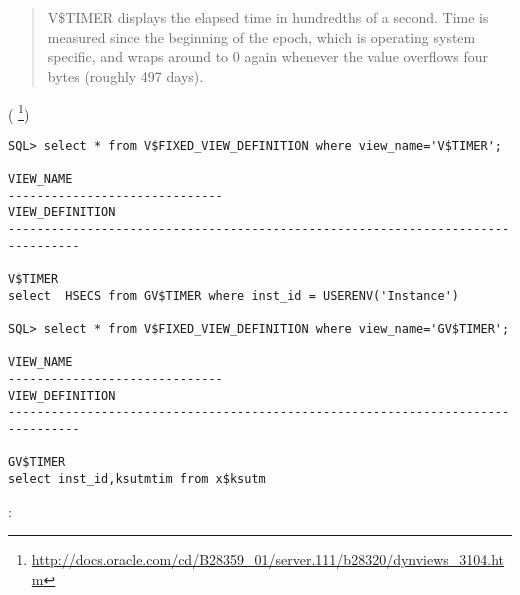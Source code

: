 \section{ \oracle}
\index{\oracle}

 

\begin{framed}
\begin{quotation}
V\$TIMER displays the elapsed time in hundredths of a second. Time is measured since the beginning of the epoch, 
which is operating system specific, and wraps around to 0 again whenever the value overflows four bytes 
(roughly 497 days).
\end{quotation}
\end{framed}(
\footnote{\url{http://docs.oracle.com/cd/B28359_01/server.111/b28320/dynviews_3104.htm}})



\begin{lstlisting}
SQL> select * from V$FIXED_VIEW_DEFINITION where view_name='V$TIMER';

VIEW_NAME
------------------------------
VIEW_DEFINITION
--------------------------------------------------------------------------------

V$TIMER
select  HSECS from GV$TIMER where inst_id = USERENV('Instance')

SQL> select * from V$FIXED_VIEW_DEFINITION where view_name='GV$TIMER';

VIEW_NAME
------------------------------
VIEW_DEFINITION
--------------------------------------------------------------------------------

GV$TIMER
select inst_id,ksutmtim from x$ksutm
\end{lstlisting}

:

